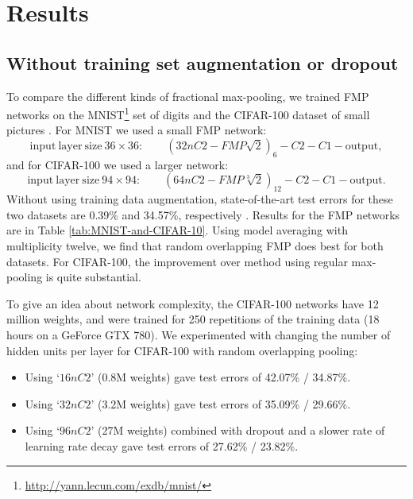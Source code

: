 \documentclass[english]{article}
\begin{document}
\section{Results\label{sec:Results}}


\subsection{Without training set augmentation or dropout\label{sec:withoutDataAug}}

To compare the different kinds of fractional max-pooling, we trained
FMP networks on the MNIST\footnote{\url{http://yann.lecun.com/exdb/mnist/}} set of digits and the CIFAR-100 dataset of small pictures \cite{CIFAR10}.
For MNIST we used a small FMP network:
\[
\mathrm{input}\ \mathrm{layer}\ \mathrm{size}\ 36\times36:\qquad(32nC2-FMP\sqrt{2})_{6}-C2-C1-\mathrm{output},
\]
and for CIFAR-100 we used a larger network:
\[
\mathrm{input}\ \mathrm{layer}\ \mathrm{size}\ 94\times94:\qquad(64nC2-FMP\sqrt[3]{2})_{12}-C2-C1-\mathrm{output}.
\]
Without using training data augmentation, state-of-the-art test errors
for these two datasets are 0.39\% and 34.57\%, respectively \cite{DeeplySupervisedNets}.
Results for the FMP networks are in Table \ref{tab:MNIST-and-CIFAR-10}.
Using model averaging with multiplicity twelve, we find that random
overlapping FMP does best for both datasets. For CIFAR-100, the improvement
over method using regular max-pooling is quite substantial.

To give an idea about network complexity, the CIFAR-100 networks have 12 million weights, and were trained for 250 repetitions of the training data (18 hours on a GeForce GTX 780). We experimented with changing the number of hidden units per layer for CIFAR-100 with random overlapping pooling:
\begin{itemize}
\item Using `$16nC2$' (0.8M weights) gave test errors of 42.07\% / 34.87\%.
\item Using `$32nC2$' (3.2M weights) gave test errors of 35.09\% / 29.66\%.
\item Using `$96nC2$' (27M weights) combined with dropout and a slower rate of learning rate decay gave test errors of 27.62\% / 23.82\%.
\end{itemize}
\end{document}
